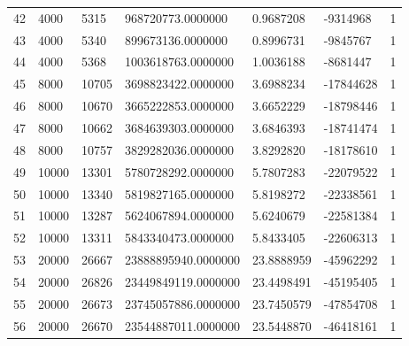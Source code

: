 \begin{longtable}{lllllll}
    42               & 4000           & 5315           & 968720773.0000000     & 0.9687208        & -9314968        & 1                    \\
    43               & 4000           & 5340           & 899673136.0000000     & 0.8996731        & -9845767        & 1                    \\
    44               & 4000           & 5368           & 1003618763.0000000    & 1.0036188        & -8681447        & 1                    \\
    45               & 8000           & 10705          & 3698823422.0000000    & 3.6988234        & -17844628       & 1                    \\
    46               & 8000           & 10670          & 3665222853.0000000    & 3.6652229        & -18798446       & 1                    \\
    47               & 8000           & 10662          & 3684639303.0000000    & 3.6846393        & -18741474       & 1                    \\
    48               & 8000           & 10757          & 3829282036.0000000    & 3.8292820        & -18178610       & 1                    \\
    49               & 10000          & 13301          & 5780728292.0000000    & 5.7807283        & -22079522       & 1                    \\
    50               & 10000          & 13340          & 5819827165.0000000    & 5.8198272        & -22338561       & 1                    \\
    51               & 10000          & 13287          & 5624067894.0000000    & 5.6240679        & -22581384       & 1                    \\
    52               & 10000          & 13311          & 5843340473.0000000    & 5.8433405        & -22606313       & 1                    \\
    53               & 20000          & 26667          & 23888895940.0000000   & 23.8888959       & -45962292       & 1                    \\
    54               & 20000          & 26826          & 23449849119.0000000   & 23.4498491       & -45195405       & 1                    \\
    55               & 20000          & 26673          & 23745057886.0000000   & 23.7450579       & -47854708       & 1                    \\
    56               & 20000          & 26670          & 23544887011.0000000   & 23.5448870       & -46418161       & 1                    \\

\end{longtable}

